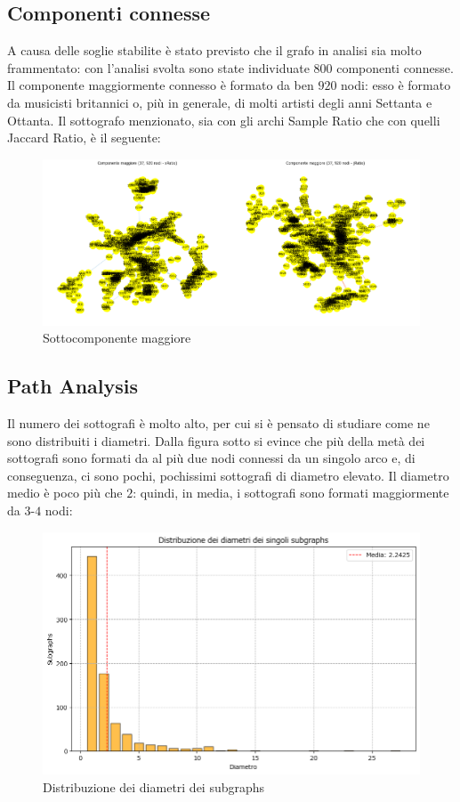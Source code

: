 \documentclass[sigchi]{acmart}
\begin{document}
\subsection{Componenti connesse}

A causa delle soglie stabilite è stato previsto che il grafo in analisi sia molto frammentato: con l'analisi svolta sono state individuate $800$ componenti connesse. Il componente maggiormente connesso è formato da ben $920$ nodi: esso è formato da musicisti britannici o, più in generale, di molti artisti degli anni Settanta e Ottanta. Il sottografo menzionato, sia con gli archi Sample Ratio che con quelli Jaccard Ratio, è il seguente:

\begin{figure}[H]
\centering
\includegraphics[width=0.45
\textwidth]{../network_analysis/plots/2_4/lrgstCmpnt.png}
\caption{Sottocomponente maggiore}
\label{fig:lrgstCmpnt}
\end{figure}

\subsection{Path Analysis}

Il numero dei sottografi è molto alto, per cui si è pensato di studiare come ne sono distribuiti i diametri. Dalla figura sotto si evince che più della metà dei sottografi sono formati da al più due nodi connessi da un singolo arco e, di conseguenza, ci sono pochi, pochissimi sottografi di diametro elevato. Il diametro medio è poco più che $2$: quindi, in media, i sottografi sono formati maggiormente da $3$-$4$ nodi:

\begin{figure}[H]
\centering
\includegraphics[width=0.45
\textwidth]{../network_analysis/plots/2_5/dmtDist.png}
\caption{Distribuzione dei diametri dei subgraphs}
\label{fig:dmtDist}
\end{figure}
\end{document}
